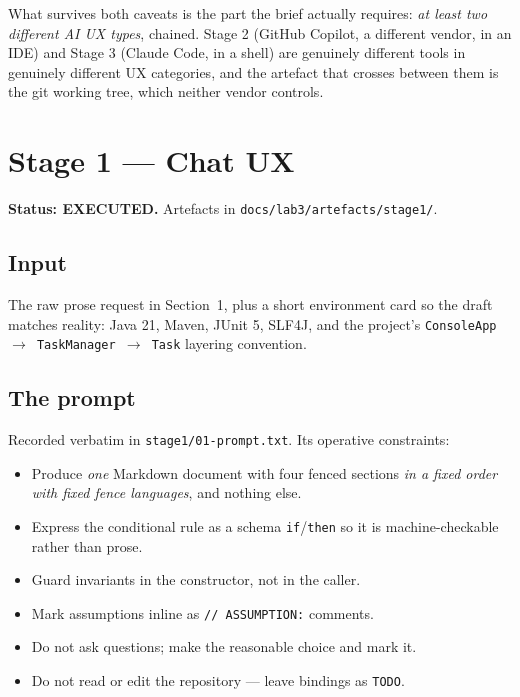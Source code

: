 \documentclass[11pt,a4paper]{article}
\newcommand{\code}[1]{\texttt{\small #1}}
\newcommand{\ran}{\textcolor{good}{\textbf{EXECUTED}}}
\begin{document}
What survives both caveats is the part the brief actually requires: \emph{at
least two different AI UX types}, chained. Stage 2 (GitHub Copilot, a different
vendor, in an IDE) and Stage 3 (Claude Code, in a shell) are genuinely
different tools in genuinely different UX categories, and the artefact that
crosses between them is the git working tree, which neither vendor controls.

\section{Stage 1 --- Chat UX}

\textbf{Status: \ran.} Artefacts in \code{docs/lab3/artefacts/stage1/}.

\subsection{Input}

The raw prose request in Section~1, plus a short environment card so the draft
matches reality: Java 21, Maven, JUnit 5, SLF4J, and the project's
\code{ConsoleApp $\rightarrow$ TaskManager $\rightarrow$ Task} layering
convention.

\subsection{The prompt}

Recorded verbatim in \code{stage1/01-prompt.txt}. Its operative constraints:

\begin{itemize}
  \item Produce \emph{one} Markdown document with four fenced sections
        \emph{in a fixed order with fixed fence languages}, and nothing else.
  \item Express the conditional rule as a schema \code{if}/\code{then} so it is
        machine-checkable rather than prose.
  \item Guard invariants in the constructor, not in the caller.
  \item Mark assumptions inline as \code{// ASSUMPTION:} comments.
  \item Do not ask questions; make the reasonable choice and mark it.
  \item Do not read or edit the repository --- leave bindings as \code{TODO}.
\end{itemize}
\end{document}
